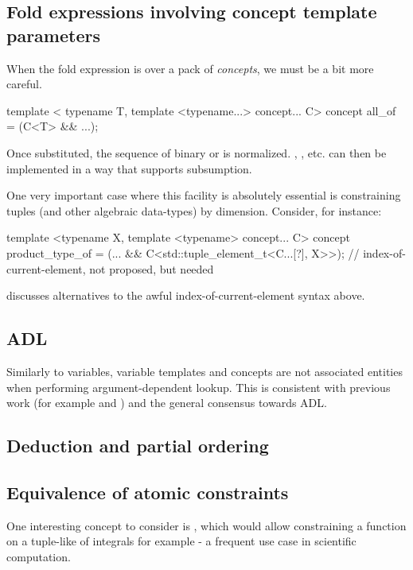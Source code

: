 \documentclass{wg21}
\begin{document}
\subsection{Fold expressions involving concept template parameters}

When the fold expression is over a pack of \emph{concepts}, we must be a bit more careful.

\begin{colorblock}
template <
    typename T,
    template <typename...> concept... C>
concept all_of = (C<T> && ...);
\end{colorblock}

Once substituted, the sequence of binary \tcode{\&\&} or \tcode{||} is normalized.
, , etc. can then be implemented in a way that supports subsumption.

One very important case where this facility is absolutely essential is constraining tuples (and other algebraic data-types) by dimension. Consider, for instance:

\begin{colorblock}
template <typename X, template <typename> concept... C>
concept product_type_of = (... && C<std::tuple_element_t<C...[?], X>>);
//   index-of-current-element, not proposed, but needed  ~~~~~~~
\end{colorblock}

 discusses alternatives to the awful index-of-current-element syntax above.

\subsection{ADL}

Similarly to variables, variable templates and concepts are not associated entities when performing argument-dependent lookup.
This is consistent with previous work (for example  and ) and the general consensus towards ADL.

\subsection{Deduction and partial ordering}

\subsection{Equivalence of atomic constraints}

One interesting concept to consider is , which would allow constraining a function on a tuple-like of integrals for example - a frequent use case in scientific computation.
\end{document}
